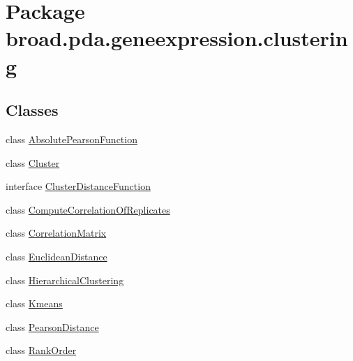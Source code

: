 \hypertarget{namespacebroad_1_1pda_1_1geneexpression_1_1clustering}{\section{Package broad.\+pda.\+geneexpression.\+clustering}
\label{namespacebroad_1_1pda_1_1geneexpression_1_1clustering}
}
\subsection*{Classes}
\begin{DoxyCompactItemize}
\item 
class \hyperlink{classbroad_1_1pda_1_1geneexpression_1_1clustering_1_1_absolute_pearson_function}{Absolute\+Pearson\+Function}
\item 
class \hyperlink{classbroad_1_1pda_1_1geneexpression_1_1clustering_1_1_cluster}{Cluster}
\item 
interface \hyperlink{interfacebroad_1_1pda_1_1geneexpression_1_1clustering_1_1_cluster_distance_function}{Cluster\+Distance\+Function}
\item 
class \hyperlink{classbroad_1_1pda_1_1geneexpression_1_1clustering_1_1_compute_correlation_of_replicates}{Compute\+Correlation\+Of\+Replicates}
\item 
class \hyperlink{classbroad_1_1pda_1_1geneexpression_1_1clustering_1_1_correlation_matrix}{Correlation\+Matrix}
\item 
class \hyperlink{classbroad_1_1pda_1_1geneexpression_1_1clustering_1_1_euclidean_distance}{Euclidean\+Distance}
\item 
class \hyperlink{classbroad_1_1pda_1_1geneexpression_1_1clustering_1_1_hierarchical_clustering}{Hierarchical\+Clustering}
\item 
class \hyperlink{classbroad_1_1pda_1_1geneexpression_1_1clustering_1_1_kmeans}{Kmeans}
\item 
class \hyperlink{classbroad_1_1pda_1_1geneexpression_1_1clustering_1_1_pearson_distance}{Pearson\+Distance}
\item 
class \hyperlink{classbroad_1_1pda_1_1geneexpression_1_1clustering_1_1_rank_order}{Rank\+Order}
\end{DoxyCompactItemize}
